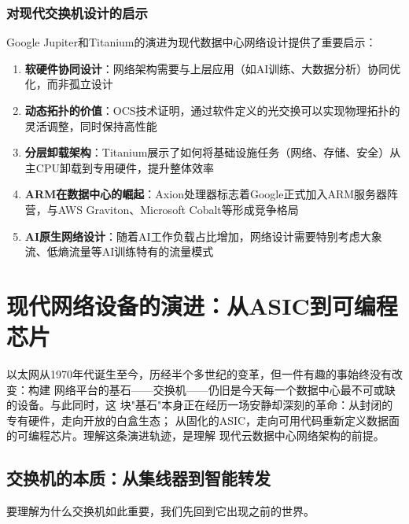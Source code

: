 \subsubsection{对现代交换机设计的启示}

Google Jupiter和Titanium的演进为现代数据中心网络设计提供了重要启示：

\begin{enumerate}
    \item \textbf{软硬件协同设计}：网络架构需要与上层应用（如AI训练、大数据分析）协同优化，而非孤立设计
    
    \item \textbf{动态拓扑的价值}：OCS技术证明，通过软件定义的光交换可以实现物理拓扑的灵活调整，同时保持高性能
    
    \item \textbf{分层卸载架构}：Titanium展示了如何将基础设施任务（网络、存储、安全）从主CPU卸载到专用硬件，提升整体效率
    
    \item \textbf{ARM在数据中心的崛起}：Axion处理器标志着Google正式加入ARM服务器阵营，与AWS Graviton、Microsoft Cobalt等形成竞争格局
    
    \item \textbf{AI原生网络设计}：随着AI工作负载占比增加，网络设计需要特别考虑大象流、低熵流量等AI训练特有的流量模式
\end{enumerate}

\section{现代网络设备的演进：从ASIC到可编程芯片}

以太网从1970年代诞生至今，历经半个多世纪的变革，但一件有趣的事始终没有改变：构建
网络平台的基石——交换机——仍旧是今天每一个数据中心最不可或缺的设备。与此同时，这
块"基石"本身正在经历一场安静却深刻的革命：从封闭的专有硬件，走向开放的白盒生态；
从固化的ASIC，走向可用代码重新定义数据面的可编程芯片。理解这条演进轨迹，是理解
现代云数据中心网络架构的前提。

\subsection{交换机的本质：从集线器到智能转发}

要理解为什么交换机如此重要，我们先回到它出现之前的世界。

